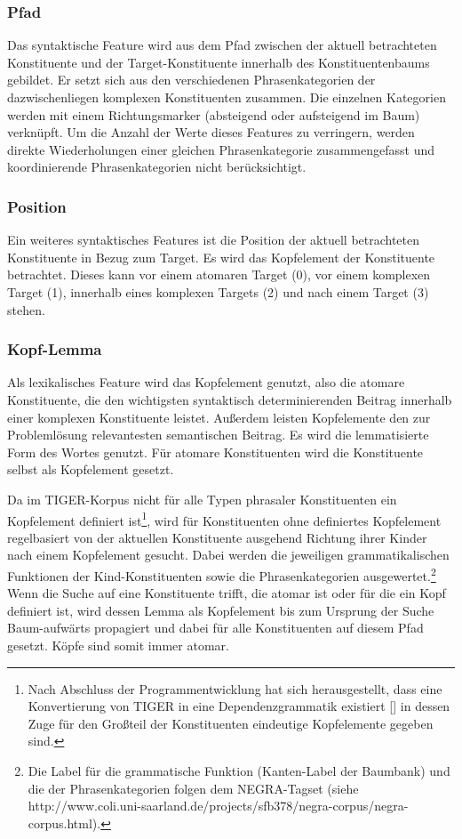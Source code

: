 \documentclass[12pt]{article}
\begin{document}
\subsubsection*{Pfad}
Das syntaktische Feature wird aus dem Pfad zwischen der aktuell betrachteten Konstituente und der Target-Konstituente innerhalb des Konstituentenbaums gebildet. Er setzt sich aus den verschiedenen Phrasenkategorien der dazwischenliegen komplexen Konstituenten zusammen. Die einzelnen Kategorien werden mit einem Richtungsmarker (absteigend oder aufsteigend im Baum) verknüpft. Um die Anzahl der Werte dieses Features zu verringern, werden direkte Wiederholungen einer gleichen Phrasenkategorie zusammengefasst und koordinierende Phrasenkategorien nicht berücksichtigt.
\subsubsection*{Position}
Ein weiteres syntaktisches Features ist die Position der aktuell betrachteten Konstituente in Bezug zum Target. Es wird das Kopfelement der Konstituente betrachtet. Dieses kann vor einem atomaren Target (0), vor einem komplexen Target (1), innerhalb eines komplexen Targets (2) und nach einem Target (3) stehen.
\subsubsection*{Kopf-Lemma}
Als lexikalisches Feature wird das Kopfelement genutzt, also die atomare Konstituente, die den wichtigsten syntaktisch determinierenden Beitrag innerhalb einer komplexen Konstituente leistet. Außerdem leisten Kopfelemente den zur Problemlösung relevantesten semantischen Beitrag. Es wird die lemmatisierte Form des Wortes genutzt. Für atomare Konstituenten
wird die Konstituente selbst als Kopfelement gesetzt.

Da im TIGER-Korpus nicht für alle Typen phrasaler Konstituenten ein Kopfelement definiert ist\footnote{Nach Abschluss der Programmentwicklung hat sich herausgestellt, dass eine Konvertierung von TIGER in eine Dependenzgrammatik existiert [\cite{kountz_extraktion_2006}] in dessen Zuge für den Großteil der Konstituenten eindeutige Kopfelemente gegeben sind.}, wird für Konstituenten ohne definiertes Kopfelement regelbasiert von der aktuellen Konstituente ausgehend Richtung ihrer Kinder nach einem Kopfelement gesucht. Dabei werden die jeweiligen grammatikalischen Funktionen der Kind-Konstituenten sowie die Phrasenkategorien ausgewertet.\footnote{Die Label für die grammatische Funktion (Kanten-Label der Baumbank) und die der Phrasenkategorien folgen dem NEGRA-Tagset (siehe http://www.coli.uni-saarland.de/projects/sfb378/negra-corpus/negra-corpus.html).} Wenn die Suche auf eine Konstituente trifft, die atomar ist oder für die ein Kopf definiert ist, wird dessen Lemma als Kopfelement bis zum Ursprung der Suche Baum-aufwärts propagiert und dabei für alle Konstituenten auf diesem Pfad gesetzt. Köpfe sind somit immer atomar.
\end{document}

